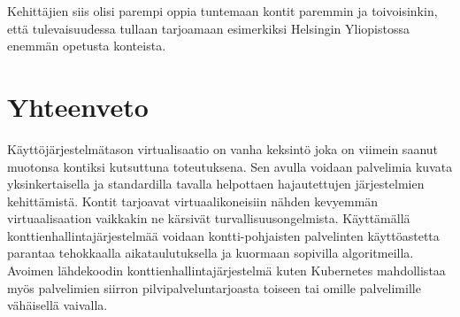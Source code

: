 \documentclass[finnish,gradu]{tktltiki3}
\begin{document}
    Kehittäjien siis olisi parempi oppia tuntemaan kontit paremmin ja toivoisinkin, että tulevaisuudessa tullaan tarjoamaan esimerkiksi Helsingin Yliopistossa enemmän opetusta konteista.
    
    \section{Yhteenveto}
    
    Käyttöjärjestelmätason virtualisaatio on vanha keksintö joka on viimein saanut muotonsa kontiksi kutsuttuna toteutuksena. Sen avulla voidaan palvelimia kuvata yksinkertaisella ja standardilla tavalla helpottaen hajautettujen järjestelmien kehittämistä. Kontit tarjoavat virtuaalikoneisiin nähden kevyemmän virtuaalisaation vaikkakin ne kärsivät turvallisuusongelmista. Käyttämällä konttienhallintajärjestelmää voidaan kontti-pohjaisten palvelinten käyttöastetta parantaa tehokkaalla aikataulutuksella ja kuormaan sopivilla algoritmeilla. Avoimen lähdekoodin konttienhallintajärjestelmä kuten Kubernetes mahdollistaa myös palvelimien siirron pilvipalveluntarjoasta toiseen tai omille palvelimille vähäisellä vaivalla.
    
    \nocite{*}
    
    
    
    
    
    
    
    
    
    
    
    
    \lastpage
    
    \appendices
    
    \pagestyle{empty}
    
    
\end{document}
